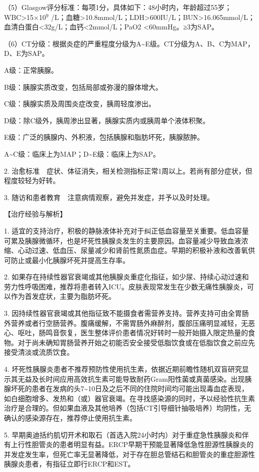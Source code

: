（5）Glasgow评分标准：每项1分，具体如下：48小时内，年龄超过55岁；WBC\textgreater{}15×10$^{9}$
/L；血糖\textgreater{}10.8mmol/L；LDH\textgreater{}600IU/L；BUN\textgreater{}16.065mmol/L；血清白蛋白\textless{}32g/L；血钙\textless{}2mmol/L；PaO{2}
\textless{}60mmHg。≥3为SAP。

（6）CT分级：根据炎症的严重程度分级为A\textasciitilde{}E级。CT分级为A、B、C为MAP，D、E为SAP。

A级：正常胰腺。

B级：胰腺实质改变，包括局部或弥漫的腺体增大。

C级：胰腺实质及周围炎症改变，胰周轻度渗出。

D级：除C级外，胰周渗出显著，胰腺实质内或胰周单个液体积聚。

E级：广泛的胰腺内、外积液，包括胰腺和脂肪坏死，胰腺脓肿。

A\textasciitilde{}C级：临床上为MAP；D\textasciitilde{}E级：临床上为SAP。

2.
治愈标准　症状、体征消失，相关检测指标正常1周以上。若尚有部分症状，但程度较轻为好转。

3. 随访和患者教育　注意病情观察，避免并发症，并予以及时处理。

【治疗经验与解析】

1.
适宜的支持治疗，积极的静脉液体补充对于纠正低血容量至关重要。低血容量可累及胰腺微循环，也是坏死性胰腺炎发生的主要原因。血容量减少导致血液浓缩、心动过速、低血压、尿量减少和肾前性氮质血症。早期的积极补液和改善氧供可防止或最小化胰腺坏死并提高生存率。

2.
如果存在持续性器官衰竭或其他胰腺炎重症化指征，如少尿、持续心动过速和劳力性呼吸困难，推荐将患者转入ICU。皮肤表现常发生在少数无痛性胰腺炎，可以作为首发症状，主要为脂肪坏死。

3.
因持续性器官衰竭或其他指征致不能摄食者需营养支持。营养支持可由全胃肠外营养或者行空肠营养。腹痛缓解，不需胃肠外麻醉剂，腹部压痛明显减轻，无恶心、呕吐，肠鸣音恢复，医生整体评价患者情况好转时一般开始摄入限定热量的食物。对于尚未确知胃肠营养开始之初能否安全接受低脂饮食或在低脂饮食之前应先接受清淡或流质饮食。

4.
坏死性胰腺炎患者不推荐预防性使用抗生素，依据近期前瞻性随机双盲研究显示其无益及长时间应用高效抗生素可能导致耐药Gram阳性菌或真菌感染。出现胰腺坏死的患者在发病的头7\textasciitilde{}10日及之后不同的住院时间均可能出现毒血症表现，如白细胞增多、发热和（或）器官衰竭。在寻找感染源的同时，予以经验性抗生素治疗是合理的。但如果血液及其他培养（包括CT引导细针抽吸培养）均阴性，无确认的感染源存在，推荐停止使用抗生素。

5.
早期奥迪括约肌切开术和取石（首选入院24小时内）对于重症急性胰腺炎和伴有上行性胆管炎的患者明显有益。ERCP早期干预能显著降低急性胆源性胰腺炎的并发症发生率，但死亡率无显著降低，对于存在胆总管结石和胆管炎的重症胆源性胰腺炎患者，有指征立即行ERCP和EST。

